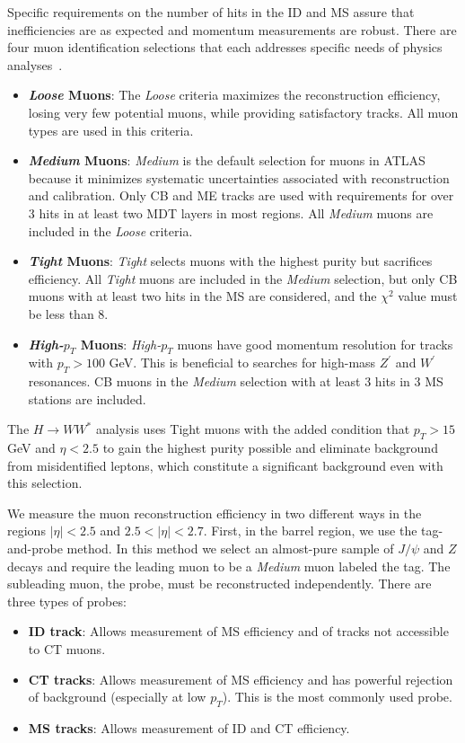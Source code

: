 Specific requirements on the number of hits in the ID and MS assure that inefficiencies are as expected and momentum measurements are robust. There are four muon identification selections that each addresses specific needs of physics analyses~\cite{MCPpaper}.

\begin{itemize}
\item \textbf{\textit{Loose} Muons}: The \textit{Loose} criteria maximizes the reconstruction efficiency, losing very few potential muons, while providing satisfactory tracks. All muon types are used in this criteria.
\item \textbf{\textit{Medium} Muons}: \textit{Medium} is the default selection for muons in ATLAS because it minimizes systematic uncertainties associated with reconstruction and calibration. Only CB and ME tracks are used with requirements for over 3 hits in at least two MDT layers in most regions. All \textit{Medium} muons are included in the \textit{Loose} criteria.
\item \textbf{\textit{Tight} Muons}: \textit{Tight} selects muons with the highest purity but sacrifices efficiency. All \textit{Tight} muons are included in the \textit{Medium} selection, but only CB muons with at least two hits in the MS are considered, and the $\chi^2$ value must be less than $8$.  
\item \textbf{\textit{High-$p_T$} Muons}: \textit{High-$p_T$} muons have good momentum resolution for tracks with $p_T > 100$ GeV. This is beneficial to searches for high-mass $Z^\prime$ and $W^\prime$ resonances. CB muons in the \textit{Medium} selection with at least $3$ hits in $3$ MS stations are included. 
\end{itemize}

The $H\rightarrow WW^*$ analysis uses Tight muons with the added condition that $p_T>15$ GeV and $\eta<2.5$ to gain the highest purity possible and eliminate background from misidentified leptons, which constitute a significant background even with this selection. 

We measure the muon reconstruction efficiency in two different ways in the regions $|\eta|  < 2.5$ and $2.5 < |\eta|  < 2.7$. First, in the barrel region, we use the tag-and-probe method. In this method we select an almost-pure sample of $J/\psi$ and $Z$ decays and require the leading muon to be a \textit{Medium} muon labeled the tag. The subleading muon, the probe, must be reconstructed independently. There are three types of probes:
\begin{itemize}
\item \textbf{ID track}: Allows measurement of MS efficiency and of tracks not accessible to CT muons. 
\item \textbf{CT tracks}: Allows measurement of MS efficiency and has powerful rejection of background (especially at low $p_T$). This is the most commonly used probe. 
\item \textbf{MS tracks}: Allows measurement of ID and CT efficiency.
\end{itemize}

